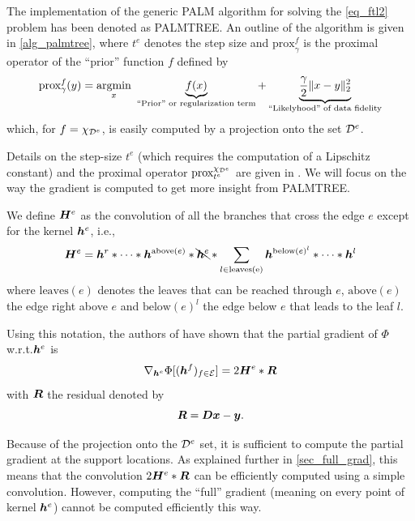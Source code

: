 The implementation of the generic \ac{PALM} algorithm for solving the \eqref{eq_ftl2} problem has been denoted as \ac{PALMTREE}. 
An outline of the algorithm is given in \cref{alg_palmtree}, where $t^e$ denotes the step size and $\text{prox}^f_\gamma$ is the proximal operator of the “prior” function $f$ defined by \begin{equation*}\text{prox}^f_\gamma(y) = \underset{x}{\operatorname{argmin}}~ \underbrace{f(x)}_{\text{“Prior” or regularization term}} + \underbrace{\frac{\gamma}{2} \lVert x - y \rVert^2_2}_{\text{“Likelyhood” of data fidelity}}\end{equation*} which, for $f = \chi_{{\mathcal D}^e}$, is easily computed by a projection onto the set ${\mathcal D}^e$.

\noindent
Details on the step-size $t^e$ (which requires the computation of a Lipschitz constant) and the proximal operator $\text{prox}^{\chi_{{\mathcal D}^e}}_{t^e}$ are given in \cite{chabiron_optimization_2016}. We will focus on the way the gradient is computed to get more insight from \ac{PALMTREE}.

\noindent
We define $\bm{H}^e$ as the convolution of all the branches that cross the edge $e$ except for the kernel $\bm{h}^e$, i.e., \begin{equation*}\bm{H}^e = \bm{h}^r * \dots * \bm{h}^{\text{above}(e)} * \bcancel{\bm{h}^{e}} * \sum_{l \in \text{leaves(e)}} \bm{h}^{\text{below}(e)^l} * \dots * \bm{h}^{l}\end{equation*} where $\text{leaves}(e)$ denotes the leaves that can be reached through $e$, $\text{above}(e)$  the edge right above $e$ and $\text{below}(e)^l$ the edge below $e$ that leads to the leaf $l$.

\noindent
Using this notation, the authors of \cite{chabiron_optimization_2016} have shown that the partial gradient of $\Phi$ w.r.t.\@ $\bm{h}^e$ is 
\begin{equation*}\nabla_{\bm{h}^e} \Phi[(\bm{h}^f)_{f \in \mathcal E}] = 2 \bm{H}^e * \bm{R}\end{equation*} with $\bm{R}$ the residual denoted by
\begin{equation*}\bm{R} = \bm{D}\bm{x} - \bm{y}. \end{equation*}

\noindent
Because of the projection onto the ${\mathcal D}^e$ set, it is sufficient to compute the partial gradient at the support locations. As explained further in \cref{sec_full_grad}, this means that the convolution $2 \bm{H}^e * \bm{R}$ can be efficiently computed using a simple convolution. However, computing the “full” gradient (meaning on every point of kernel $\bm{h}^e$) cannot be computed efficiently this way.

